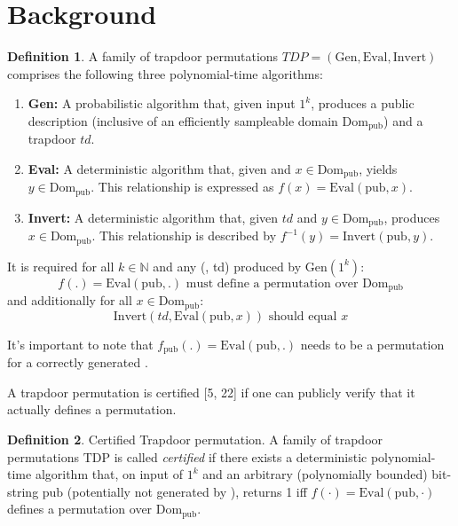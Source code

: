 \documentclass[]{final_report}
\theoremstyle{definition}
\newtheorem{definition}{Definition}[chapter]
\begin{document}
\section{Background}
\begin{definition}
\label{def:TDP}
A family of trapdoor permutations \( TDP = (\text{Gen}, \text{Eval}, \text{Invert}) \) comprises the following three polynomial-time algorithms:
\begin{enumerate}
    \item \textbf{Gen:} A probabilistic algorithm that, given input \( 1^k \), produces a public description  (inclusive of an efficiently sampleable domain \( \text{Dom}_{\text{pub}} \)) and a trapdoor \( td \).
    
    \item \textbf{Eval:} A deterministic algorithm that, given  and \( x \in \text{Dom}_{\text{pub}} \), yields \( y \in \text{Dom}_{\text{pub}} \). This relationship is expressed as \( f(x) = \text{Eval}(\text{pub}, x) \).
    
    \item \textbf{Invert:} A deterministic algorithm that, given \( td \) and \( y \in \text{Dom}_{\text{pub}} \), produces \( x \in \text{Dom}_{\text{pub}} \). This relationship is described by \( f^{-1}(y) = \text{Invert}(\text{pub}, y) \).
\end{enumerate}

It is required for all \( k \in \mathbb{N} \) and any (, td) produced by \(\text{Gen}(1^k)\):
\[ f(.) = \text{Eval}(\text{pub}, .) \text{ must define a permutation over } \text{Dom}_{\text{pub}} \]
and additionally for all \( x \in \text{Dom}_{\text{pub}} \):
\[ \text{Invert}(td, \text{Eval}(\text{pub}, x)) \text{ should equal } x \]

It's important to note that \( f_{\text{pub}}(.) = \text{Eval}(\text{pub}, .) \) needs to be a permutation for a correctly generated . 
\end{definition}

A trapdoor permutation is certified [5, 22] if one can publicly verify that it actually defines a permutation. 

\begin{definition} Certified Trapdoor permutation.
\label{def:CTDP}
A family of trapdoor permutations \( \text{TDP} \) is called \textit{certified} if there exists a deterministic polynomial-time algorithm  that, on input of \( 1^k \) and an arbitrary (polynomially bounded) bit-string \( \text{pub} \) (potentially not generated by ), returns 1 iff \( f(\cdot) = \text{Eval}(\text{pub}, \cdot) \) defines a permutation over \( \text{Dom}_{\text{pub}} \).
\end{definition}
\end{document}
